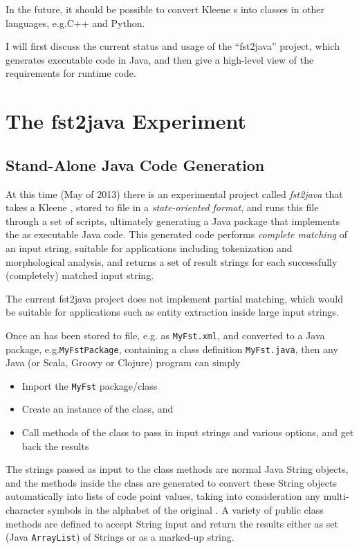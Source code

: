 In the future, it should be possible to convert Kleene \fsm{}s into classes in other languages,
e.g.\@ C++ and Python.

I will first discuss the current status and usage of the ``fst2java'' project, which generates
executable code in Java, and then give a high-level view of the requirements for runtime code.

\section{The fst2java Experiment}

\subsection{Stand-Alone Java Code Generation}

At this time (May of 2013) there is an experimental project called \emph{fst2java} that takes
a Kleene \fsm{}, stored to file in a \emph{state-oriented  format}, and runs
this  file through a set of  scripts, ultimately generating a Java package
that implements the \fsm{} as executable Java code.  This generated code performs \emph{complete
matching} of an input string, suitable for applications including tokenization and morphological
analysis, and returns a set of result strings for each successfully (completely) matched input
string.

The current fst2java project does not implement partial matching,
which would be suitable for applications such as entity extraction inside large input strings.

Once an \fsm{} has been stored to file, e.g. as \texttt{MyFst.xml}, and converted to 
a Java package, e.g.\@ \texttt{MyFstPackage}, containing a class definition
\texttt{MyFst.java}, then any Java (or Scala, Groovy or Clojure) program can simply

\begin{itemize}
\item
Import the \texttt{MyFst} package/class
\item
Create an instance of the class, and
\item
Call methods of the class to pass in input strings and various options, and get back the
results
\end{itemize}

\noindent The strings passed as input to the class methods are normal Java String objects, and the
methods inside the class are generated to convert these String objects automatically into lists of
code point values, taking into consideration any multi-character symbols in the alphabet of the
original \fsm{}.  A variety of public class methods are defined to accept String input and return
the results either as set (Java \texttt{ArrayList}) of Strings or as a marked-up  string.

